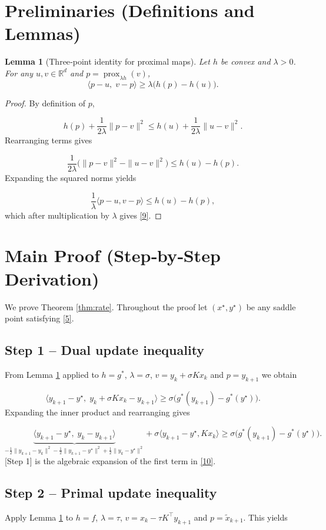 \documentclass{article}
\newtheorem{lemma}{Lemma}
\newcommand{\prox}{\operatorname{prox}}
\begin{document}
\section*{Preliminaries (Definitions and Lemmas)}
\begin{lemma}[Three‑point identity for proximal maps]\label{lem:threepoint}
Let $h$ be convex and $\lambda>0$. For any $u,v\in\mathbb R^{d}$ and $p=\prox_{\lambda h}(v)$,
\[
\langle p-u,\; v-p\rangle \ge \lambda\bigl( h(p)-h(u)\bigr).
\tag{9}
\]
\end{lemma}
\begin{proof}
By definition of $p$,  

\[
h(p)+\frac{1}{2\lambda}\|p-v\|^{2}\le h(u)+\frac{1}{2\lambda}\|u-v\|^{2}.
\]
Rearranging terms gives  

\[
\frac{1}{2\lambda}\bigl(\|p-v\|^{2}-\|u-v\|^{2}\bigr)\le h(u)-h(p).
\]
Expanding the squared norms yields  

\[
\frac{1}{\lambda}\langle p-u, v-p\rangle\le h(u)-h(p),
\]
which after multiplication by $\lambda$ gives \eqref{9}.  \hfill\qedsymbol
\end{proof}

\section*{Main Proof (Step‑by‑Step Derivation)}
We prove Theorem \ref{thm:rate}. Throughout the proof let $(x^{\star},y^{\star})$ be any saddle point satisfying \eqref{5}.  

\subsection*{Step 1 – Dual update inequality}
From Lemma \ref{lem:threepoint} applied to $h=g^{*}$, $\lambda=\sigma$, $v=y_{k}+ \sigma Kx_{k}$ and $p=y_{k+1}$ we obtain  

\[
\langle y_{k+1}-y^{\star},\; y_{k}+ \sigma Kx_{k}-y_{k+1}\rangle
      \ge \sigma\bigl(g^{*}(y_{k+1})-g^{*}(y^{\star})\bigr).
\tag{10}
\]
Expanding the inner product and rearranging gives  

\[
\underbrace{\langle y_{k+1}-y^{\star},\; y_{k}-y_{k+1}\rangle}_{\displaystyle -\frac12\|y_{k+1}-y_{k}\|^{2}
            -\frac12\|y_{k+1}-y^{\star}\|^{2}+\frac12\|y_{k}-y^{\star}\|^{2}}
  +\sigma\langle y_{k+1}-y^{\star},Kx_{k}\rangle
   \ge \sigma\bigl(g^{*}(y_{k+1})-g^{*}(y^{\star})\bigr).
\tag{11}
\]
[Step 1] is the algebraic expansion of the first term in \eqref{10}.

\subsection*{Step 2 – Primal update inequality}
Apply Lemma \ref{lem:threepoint} to $h=f$, $\lambda=\tau$, $v=x_{k}-\tau K^{\top}y_{k+1}$ and $p=\tilde x_{k+1}$. This yields  
\end{document}
